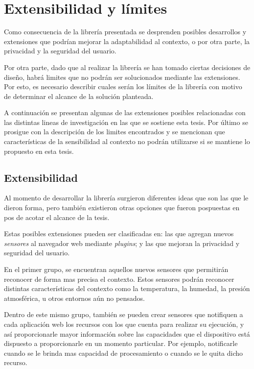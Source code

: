 
\chapter{Extensibilidad y límites}
\label{Capitulo 6}

Como consecuencia de la librería presentada se desprenden posibles desarrollos y extensiones que podrían mejorar la adaptabilidad al contexto, o por otra parte, la privacidad y la seguridad del usuario.

Por otra parte, dado que al realizar la librería se han tomado ciertas decisiones de diseño, habrá limites que no podrán ser solucionados mediante las extensiones. Por esto, es necesario describir cuales serán los límites de la librería con motivo de determinar el alcance de la solución planteada.

A continuación se presentan algunas de las extensiones posibles relacionadas con las distintas lineas de investigación en las que se sostiene esta tesis. Por último se prosigue con la descripción de los limites encontrados y se mencionan que características de la sensibilidad al contexto no podrán utilizarse si se mantiene lo propuesto en esta tesis.


\section{Extensibilidad}

Al momento de desarrollar la librería surgieron diferentes ideas que son las que le dieron forma, pero también existieron otras opciones que fueron pospuestas en pos de acotar el alcance de la tesis.

Estas posibles extensiones pueden ser clasificadas en: las que agregan nuevos \emph{sensores} al navegador web mediante \emph{plugins}; y las que mejoran la privacidad y seguridad del usuario.

En el primer grupo, se encuentran aquellos nuevos sensores que permitirán reconocer de forma mas precisa el contexto. Estos sensores podrán reconocer distintas características del contexto como la temperatura, la humedad, la presión atmosférica, u otros entornos aún no pensados.

Dentro de este mismo grupo, también se pueden crear sensores que notifiquen a cada aplicación web los recursos con los que cuenta para realizar su ejecución, y así proporcionarle mayor información sobre las capacidades que el dispositivo está dispuesto a proporcionarle en un momento particular. Por ejemplo, notificarle cuando se le brinda mas capacidad de procesamiento o cuando se le quita dicho recurso.

